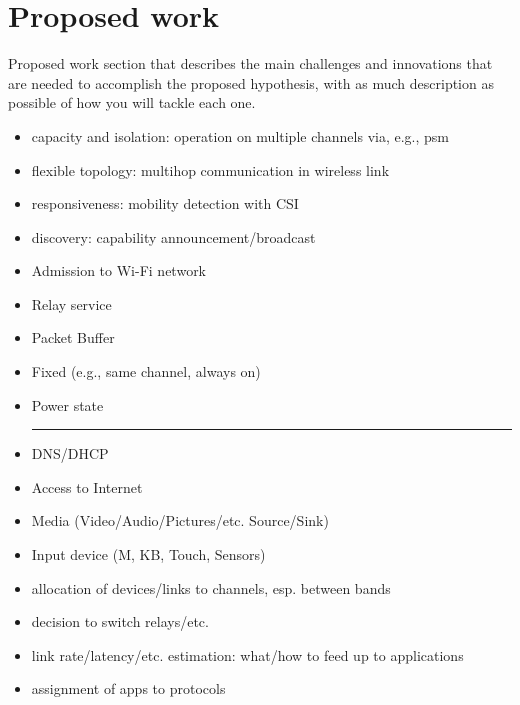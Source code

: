 \section{Proposed work}
Proposed work section that describes the main challenges and
innovations that are needed to accomplish the proposed hypothesis, with
as much description as possible of how you will tackle each one.

\begin{itemize}
\item capacity and isolation: operation on multiple channels via, e.g., psm
\item flexible topology: multihop communication in wireless link
\item responsiveness: mobility detection with CSI
\item discovery: capability announcement/broadcast
\end{itemize}

\begin{itemize}
\item Admission to Wi-Fi network
\item Relay service
\item Packet Buffer
\item Fixed (e.g., same channel, always on)
\item Power state\\
\hrule
\item DNS/DHCP
\item Access to Internet
\item Media (Video/Audio/Pictures/etc. Source/Sink)
\item Input device (M, KB, Touch, Sensors)
\end{itemize}

\begin{itemize}
\item allocation of devices/links to channels, esp. between bands
\item decision to switch relays/etc.
\item link rate/latency/etc. estimation: what/how to feed up to applications
\item assignment of apps to protocols
\end{itemize}